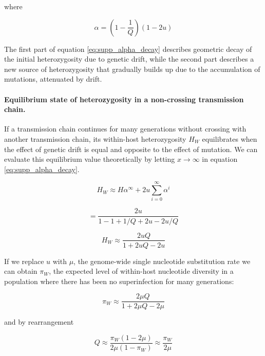 \documentclass[_main.tex]{subfiles}
\begin{document}
where 

\begin{equation}
\alpha = (1 - \frac{1}{Q}) (1 - 2u) 
\label{eq:supp_alpha}
\end{equation}

The first part of equation \ref{eq:supp_alpha_decay} describes geometric decay of the initial heterozygosity due to genetic drift, while the second part describes a new source of heterozygosity that gradually builds up due to the accumulation of mutations, attenuated by drift.  

\paragraph{Equilibrium state of heterozygosity in a non-crossing transmission chain.} If a transmission chain continues for many generations without crossing with another transmission chain, its within-host heterozygosity $H_W$ equilibrates when the effect of genetic drift is equal and opposite to the effect of mutation.  We can evaluate this equilibrium value theoretically by letting $x \rightarrow \infty$ in equation \ref{eq:supp_alpha_decay}.  

\begin{equation*}
H_W \approx H \alpha^\infty + 2u \sum_{i=0}^{\infty} \alpha^i
\end{equation*}

\begin{equation*}
= \frac{2u}{1 - 1 + 1/Q + 2u - 2u/Q}
\end{equation*}

\begin{equation}
H_W \approx \frac{2uQ}{1 + 2uQ - 2u}
\label{eq:supp_Hew}
\end{equation}

If we replace $u$ with $\mu$, the genome-wide single nucleotide substitution rate we can obtain $\pi_W$, the expected level of within-host nucleotide diversity in a population where there has been no superinfection for many generations:

\begin{equation*}
\pi_W \approx \frac{2 \mu Q}{1 + 2 \mu Q - 2 \mu}
\end{equation*}

and by rearrangement

\begin{equation*}
Q \approx \frac{\pi_W (1-2\mu)}{2 \mu (1 - \pi_W)} \approx \frac{\pi_W}{2 \mu}
\end{equation*}
\end{document}
